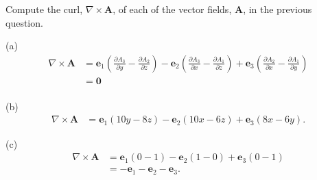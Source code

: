 \setcounter{question}{12}
\question Compute the curl, $\nabla \times \bm A$, of each of the vector fields, $\bm A$, in the previous question.
\begin{solution}
    (a)
    \begin{align*}
        \nabla \times \bm A &= \bm e_1 \left(\frac{\partial A_3}{\partial y} - \frac{\partial A_2}{\partial z}\right) - \bm e_2 \left(\frac{\partial A_3}{\partial x} - \frac{\partial A_1}{\partial z}\right) + \bm e_3 \left(\frac{\partial A_2}{\partial x} - \frac{\partial A_1}{\partial y}\right) \\
                            &= \bm 0 \\
    \end{align*}

    (b)
    \begin{align*}
        \nabla \times \bm A &= \bm e_1 (10y - 8z) - \bm e_2 (10x - 6z) + \bm e_3(8x - 6y).
    \end{align*}

    (c)
    \begin{align*}
        \nabla \times \bm A &= \bm e_1(0 - 1) - \bm e_2 (1 - 0) + \bm e_3 (0 - 1) \\
                            &= -\bm e_1 - \bm e_2 - \bm e_3.
    \end{align*}
\end{solution}

